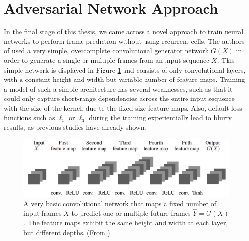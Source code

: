 \section{Adversarial Network Approach} \label{sec:related_gan}

In the final stage of this thesis, we came across a novel approach to train neural networks to perform frame prediction without using recurrent cells. The authors of \parencite{deep_multiscale_video_pred} used a very simple, overcomplete convolutional generator network $ G(X) $ in order to generate a single or multiple frames from an input sequence $ X $. This simple network is displayed in Figure \ref{fig:gan_generator} and consists of only convolutional layers, with a constant height and width but variable number of feature maps. Training a model of such a simple architecture has several weaknesses, such as that it could only capture short-range dependencies across the entire input sequence with the size of the kernel, due to the fixed size feature maps. Also, default loss functions such as $\ell_1$ or $\ell_2$ during the training experientially lead to blurry results, as previous studies have already shown.

\begin{figure}[htb]
	\centering
	\includegraphics[width=0.8\linewidth]{figures/related/deep_multiscale_generator.png} 
	\caption[Convolutional Autoencoder for Future Generation]{A very basic convolutional network that maps a fixed number of input frames $X$ to predict one or multiple future frames $\hat{Y} = G(X)$. The feature maps exhibit the same height and width at each layer, but different depths. (From \parencite{deep_multiscale_video_pred})} \label{fig:gan_generator}
\end{figure}

